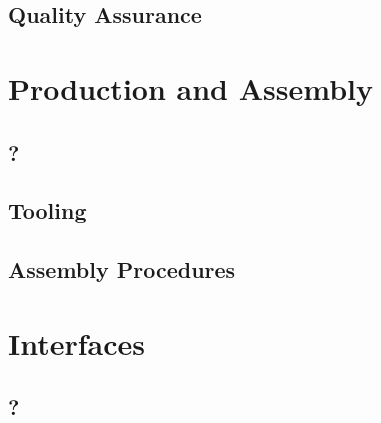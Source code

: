 \subsection{Quality Assurance}
\label{sec:fddp-slow-cryo-qa}




\section{Production and Assembly}
\label{sec:fddp-slow-cryo-prod-assy}

\subsection{?}
\label{sec:fddp-slow-cryo-??}



\subsection{Tooling}
\label{sec:fddp-slow-cryo-tooling}


\subsection{Assembly Procedures}
\label{sec:fddp-slow-cryo-assy}



\section{Interfaces}
\label{sec:fddp-slow-cryo-intfc}



\subsection{?}
\label{sec:fddp-slow-cryo-intfc-?}





